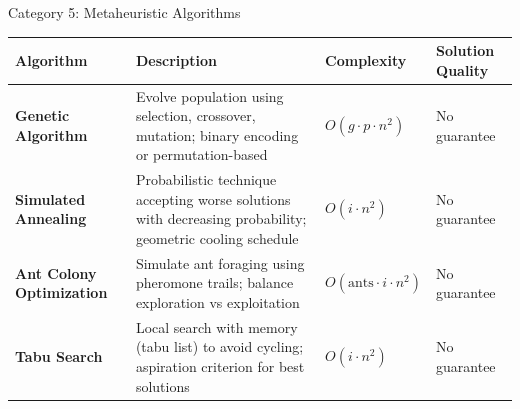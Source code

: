 \documentclass[aspectratio=169]{beamer}
\begin{document}
\begin{frame}{Category 5: Metaheuristic Algorithms}
	\begin{table}
		\tiny
		\begin{tabular}{@{}p{3cm}p{5.5cm}p{2.5cm}p{2cm}@{}}
			\toprule
			\textbf{Algorithm}                                                                                        & \textbf{Description} & \textbf{Complexity} & \textbf{Solution Quality} \\
			\midrule

			\textbf{Genetic Algorithm}                                                                                &
			Evolve population using selection, crossover, mutation; binary encoding or permutation-based              &
			$O(g \cdot p \cdot n^2)$                                                                                  &
			No guarantee                                                                                                                                                                       \\
			\midrule

			\textbf{Simulated Annealing}                                                                              &
			Probabilistic technique accepting worse solutions with decreasing probability; geometric cooling schedule &
			$O(i \cdot n^2)$                                                                                          &
			No guarantee                                                                                                                                                                       \\
			\midrule

			\textbf{Ant Colony Optimization}                                                                          &
			Simulate ant foraging using pheromone trails; balance exploration vs exploitation                         &
			$O(\text{ants} \cdot i \cdot n^2)$                                                                        &
			No guarantee                                                                                                                                                                       \\
			\midrule

			\textbf{Tabu Search}                                                                                      &
			Local search with memory (tabu list) to avoid cycling; aspiration criterion for best solutions            &
			$O(i \cdot n^2)$                                                                                          &
			No guarantee                                                                                                                                                                       \\
			\midrule


\end{tabular}
\end{table}
\end{frame}
\end{document}
